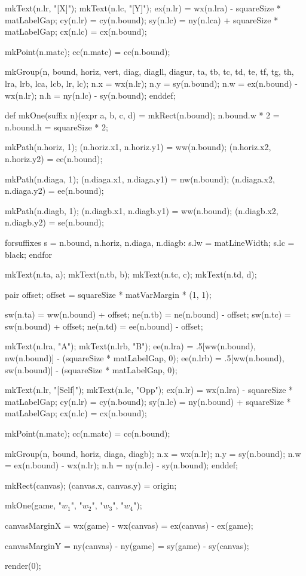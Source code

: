   mkText(n.lr, "[X]");
  mkText(n.lc, "[Y]");
  ex(n.lr) = wx(n.lra) - squareSize * matLabelGap;
  cy(n.lr) = cy(n.bound);
  sy(n.lc) = ny(n.lca) + squareSize * matLabelGap;
  cx(n.lc) = cx(n.bound);

  mkPoint(n.matc);
  cc(n.matc) = cc(n.bound);

  mkGroup(n, bound, horiz, vert, diag, diagll, diagur, ta, tb, tc, td, te, tf, tg, th, lra, lrb, lca, lcb, lr, lc);
  n.x = wx(n.lr);
  n.y = sy(n.bound);
  n.w = ex(n.bound) - wx(n.lr);
  n.h = ny(n.lc) - sy(n.bound);
enddef;

def mkOne(suffix n)(expr a, b, c, d) =
  mkRect(n.bound);
  n.bound.w * 2 = n.bound.h = squareSize * 2;

  mkPath(n.horiz, 1);
  (n.horiz.x1, n.horiz.y1) = ww(n.bound);
  (n.horiz.x2, n.horiz.y2) = ee(n.bound);

  mkPath(n.diaga, 1);
  (n.diaga.x1, n.diaga.y1) = nw(n.bound);
  (n.diaga.x2, n.diaga.y2) = ee(n.bound);

  mkPath(n.diagb, 1);
  (n.diagb.x1, n.diagb.y1) = ww(n.bound);
  (n.diagb.x2, n.diagb.y2) = se(n.bound);

  forsuffixes s = n.bound, n.horiz, n.diaga, n.diagb:
    s.lw = matLineWidth;
    s.lc = black;
  endfor

  mkText(n.ta, a);
  mkText(n.tb, b);
  mkText(n.tc, c);
  mkText(n.td, d);

  pair offset;
  offset = squareSize * matVarMargin * (1, 1);

  sw(n.ta) = ww(n.bound) + offset;
  ne(n.tb) = ne(n.bound) - offset;
  sw(n.tc) = sw(n.bound) + offset;
  ne(n.td) = ee(n.bound) - offset;

  mkText(n.lra, "A");
  mkText(n.lrb, "B");
  ee(n.lra) = .5[ww(n.bound), nw(n.bound)] - (squareSize * matLabelGap, 0);
  ee(n.lrb) = .5[ww(n.bound), sw(n.bound)] - (squareSize * matLabelGap, 0);

  mkText(n.lr, "[Self]");
  mkText(n.lc, "Opp");
  ex(n.lr) = wx(n.lra) - squareSize * matLabelGap;
  cy(n.lr) = cy(n.bound);
  sy(n.lc) = ny(n.bound) + squareSize * matLabelGap;
  cx(n.lc) = cx(n.bound);

  mkPoint(n.matc);
  cc(n.matc) = cc(n.bound);

  mkGroup(n, bound, horiz, diaga, diagb);
  n.x = wx(n.lr);
  n.y = sy(n.bound);
  n.w = ex(n.bound) - wx(n.lr);
  n.h = ny(n.lc) - sy(n.bound);
enddef;


mkRect(canvas);
(canvas.x, canvas.y) = origin;

mkOne(game, "$w_1$", "$w_2$", "$w_3$", "$w_4$");

canvasMarginX =
wx(game) - wx(canvas) =
ex(canvas) - ex(game);

canvasMarginY =
ny(canvas) - ny(game) =
sy(game) - sy(canvas);

\stopMPinitializations

\startMPpage
  render(0);
\stopMPpage
